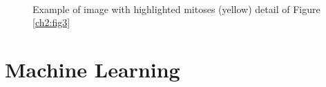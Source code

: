 \begin{figure}[!hpbt]
 \centering
  \\
  \caption[Detail of Figure \ref{ch2:fig3}]{Example of image with highlighted mitoses (yellow) detail of Figure \ref{ch2:fig3} }
  \label{ch2:fig3b}
\end{figure}

\clearpage

\section{Machine Learning}
\label{ch2:ML}

